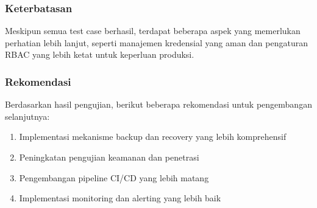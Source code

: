 \subsubsection{Keterbatasan}
Meskipun semua test case berhasil, terdapat beberapa aspek yang memerlukan
perhatian lebih lanjut, seperti manajemen kredensial yang aman dan pengaturan
RBAC yang lebih ketat untuk keperluan produksi.

\subsubsection{Rekomendasi}
Berdasarkan hasil pengujian, berikut beberapa rekomendasi untuk pengembangan
selanjutnya:
\begin{enumerate}
  \item Implementasi mekanisme backup dan recovery yang lebih komprehensif
  \item Peningkatan pengujian keamanan dan penetrasi
  \item Pengembangan pipeline CI/CD yang lebih matang
  \item Implementasi monitoring dan alerting yang lebih baik
\end{enumerate}



